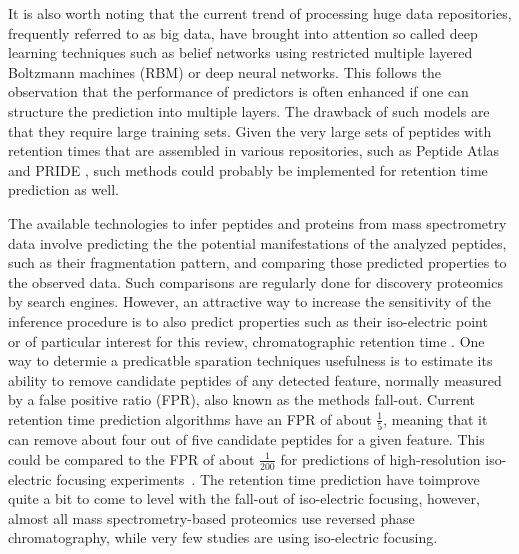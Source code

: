 \documentclass[a4paper]{article}
\begin{document}
It is also worth noting that the current trend of processing huge data
repositories, frequently referred to as big data, have brought into
attention so called deep learning techniques such as belief networks
using restricted multiple layered Boltzmann machines (RBM)
\cite{salakhutdinov2009deep} or deep neural networks. This follows the
observation that the performance of predictors is often enhanced if
one can structure the prediction into multiple layers. The drawback of
such models are that they require large training sets. Given the very
large sets of peptides with retention times that are assembled in
various repositories, such as Peptide Atlas
\cite{desiere2006peptideatlas} and PRIDE \cite{martens2005pride}, such
methods could probably be implemented for retention time prediction as
well.

The available technologies to infer peptides and proteins from mass
spectrometry data involve predicting the the potential manifestations
of the analyzed peptides, such as their fragmentation pattern, and
comparing those predicted properties to the observed data. Such
comparisons are regularly done for discovery proteomics by search
engines. However, an attractive way to increase the sensitivity of the
inference procedure is to also predict properties such as their
iso-electric point~\cite{perez2011silico,branca2014hirief} or of
particular interest for this review, chromatographic retention time
\cite{cerqueira2010mude}. One way to determie a predicatble sparation
techniques usefulness is to estimate its ability to remove candidate
peptides of any detected feature, normally measured by a false
positive ratio (FPR), also known as the methods fall-out. Current
retention time prediction algorithms have an FPR of about
$\frac{1}{5}$, meaning that it can remove about four out of five
candidate peptides for a given feature. This could be compared to the
FPR of about $\frac{1}{200}$ for predictions of high-resolution
iso-electric focusing experiments~\cite{branca2014hirief}. The
retention time prediction have toimprove quite a bit to come to level
with the fall-out of iso-electric focusing, however, almost all mass
spectrometry-based proteomics use reversed phase chromatography, while
very few studies are using iso-electric focusing.

\end{document}
